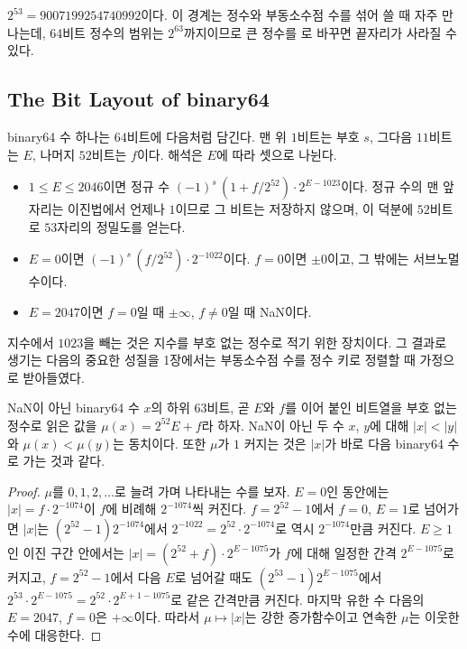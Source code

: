 $2^{53}=9007199254740992$이다. 이 경계는 정수와 부동소수점 수를 섞어 쓸 때 자주 만나는데, 64비트 정수의 범위는 $2^{63}$까지이므로 큰 정수를 로 바꾸면 끝자리가 사라질 수 있다.

\subsection{The Bit Layout of binary64}

binary64 수 하나는 $64$비트에 다음처럼 담긴다. 맨 위 $1$비트는 부호 $s$, 그다음 $11$비트는  $E$, 나머지 $52$비트는  $f$이다. 해석은 $E$에 따라 셋으로 나뉜다.
\begin{itemize}
\item $1\le E\le2046$이면 정규 수 $(-1)^s\,(1+f/2^{52})\cdot2^{E-1023}$이다. 정규 수의 맨 앞자리는 이진법에서 언제나 $1$이므로 그 비트는 저장하지 않으며, 이  덕분에 $52$비트로 $53$자리의 정밀도를 얻는다.
\item $E=0$이면 $(-1)^s\,(f/2^{52})\cdot2^{-1022}$이다. $f=0$이면 $\pm0$이고, 그 밖에는 서브노멀 수이다.
\item $E=2047$이면 $f=0$일 때 $\pm\infty$, $f\ne0$일 때 NaN이다.
\end{itemize}
지수에서 $1023$을 빼는 것은 지수를 부호 없는 정수로 적기 위한 장치이다. 그 결과로 생기는 다음의 중요한 성질을 1장에서는 부동소수점 수를 정수 키로 정렬할 때 가정으로 받아들였다.

\begin{proposition}
\label{prop:fp-bits-monotone}
NaN이 아닌 binary64 수 $x$의 하위 $63$비트, 곧 $E$와 $f$를 이어 붙인 비트열을 부호 없는 정수로 읽은 값을 $\mu(x)=2^{52}E+f$라 하자. NaN이 아닌 두 수 $x$, $y$에 대해 $|x|<|y|$와 $\mu(x)<\mu(y)$는 동치이다. 또한 $\mu$가 $1$ 커지는 것은 $|x|$가 바로 다음 binary64 수로 가는 것과 같다.
\end{proposition}

\begin{proof}
$\mu$를 $0,1,2,\dots$로 늘려 가며 나타내는 수를 보자. $E=0$인 동안에는 $|x|=f\cdot2^{-1074}$이 $f$에 비례해 $2^{-1074}$씩 커진다. $f=2^{52}-1$에서 $f=0$, $E=1$로 넘어가면 $|x|$는 $(2^{52}-1)2^{-1074}$에서 $2^{-1022}=2^{52}\cdot2^{-1074}$로 역시 $2^{-1074}$만큼 커진다. $E\ge1$인 이진 구간 안에서는 $|x|=(2^{52}+f)\cdot2^{E-1075}$가 $f$에 대해 일정한 간격 $2^{E-1075}$로 커지고, $f=2^{52}-1$에서 다음 $E$로 넘어갈 때도 $(2^{53}-1)2^{E-1075}$에서 $2^{53}\cdot2^{E-1075}=2^{52}\cdot2^{E+1-1075}$로 같은 간격만큼 커진다. 마지막 유한 수 다음의 $E=2047$, $f=0$은 $+\infty$이다. 따라서 $\mu\mapsto|x|$는 강한 증가함수이고 연속한 $\mu$는 이웃한 수에 대응한다.
\end{proof}

